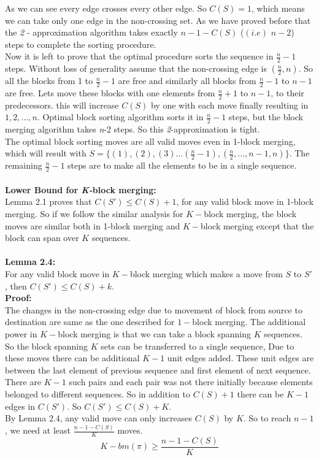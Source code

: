 \documentclass[BTech]{iitmdiss}
\begin{document}
\noindent
As we can see every edge crosses every other edge. So $C(S) = 1$, which means we can take only one edge in the non-crossing set. As we have proved before that the \textit{2} - approximation algorithm takes exactly $n-1-C(S)$ ($(i.e)$ $n-2$) steps to complete the sorting procedure.\\
Now it is left to prove that the optimal procedure sorts the sequence in $\frac{n}{2} - 1$ steps. Without loss of generality assume that the non-crossing edge is $(\frac{n}{2},n)$. So all the blocks from 1 to $\frac{n}{2} - 1$ are free and similarly all blocks from $\frac{n}{2} - 1$ to $n-1$ are free. Lets move these blocks with one elements from $\frac{n}{2} + 1$ to $n-1$, to their predecessors. this will increase $C(S)$ by one with each move finally resulting in $1,2,...,n$. Optimal block sorting algorithm sorts it in  $\frac{n}{2} - 1$ steps, but the block merging algorithm takes \textit{n}-2 steps. So this \textit{2}-approximation is tight.\\
The optimal block sorting moves are all valid moves even in 1-block merging, which will result with $S = \{(1),(2),(3)...(\frac{n}{2}-1),(\frac{n}{2},...,n-1,n)\}$. The remaining $\frac{n}{2} - 1$ steps are to make all the elements to be in a single sequence.\\~\\
\textbf{Lower Bound for \textit{K-}block merging:}\\
Lemma 2.1 proves that $C(S') \leq C(S) + 1$, for any valid block move in 1-block merging. So if we follow the similar analysis for $K-$block merging, the block moves are similar both in 1-block merging and $K-$block merging except that the block can span over $K$ sequences.\\~\\
\textbf{Lemma 2.4:}\\
For any valid block move in $K-$block merging which makes a move from $S$ to $S'$, then $C(S') \leq C(S) + k.$\\
\textbf{Proof:}\\
The changes in the non-crossing edge due to movement of block from source to destination are same as the one described for $1-$block merging. The additional power in $K-$block merging is that we can take a block spanning $K$ sequences. So the block spanning $K$ sets can be transferred to a single sequence, Due to these moves there can be additional $K-1$ unit edges added. These unit edges are between the last element of previous sequence and first element of next sequence. There are $K-1$ such pairs and each pair was not there initially because elements belonged to different sequences. So in addition to $C(S) + 1$ there can be $K-1$ edges in $C(S')$. So $C(S') \leq C(S) + K$. 
\\
By Lemma 2.4, any valid move can only increases $C(S)$ by $K$. So to reach $n-1$, we need at least $\frac{n-1-C(S)}{K}$ moves.
$$K-bm(\pi) \geq \frac{n-1-C(S)}{K}$$
\end{document}
